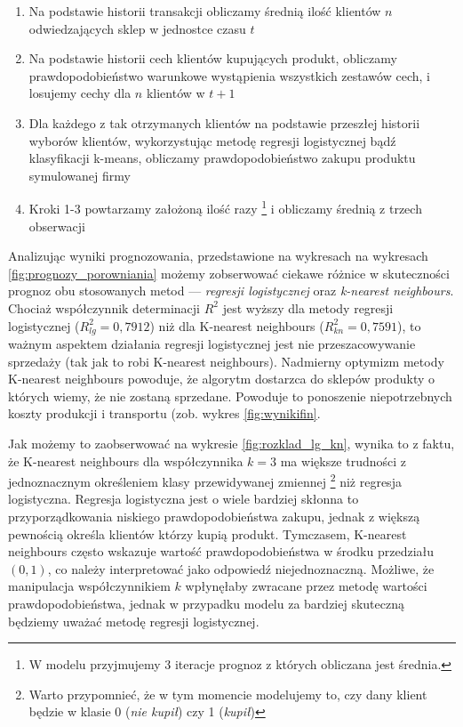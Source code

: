 \documentclass[polish, twoside, 12pt, a4paper]{article}
\theoremstyle{definition}
\theoremstyle{plain}
\theoremstyle{remark}
\begin{document}
\begin{enumerate}
	\item Na podstawie historii transakcji obliczamy średnią ilość klientów $n$ odwiedzających sklep w jednostce czasu $t$
	\item Na podstawie historii cech klientów kupujących produkt, obliczamy prawdopodobieństwo warunkowe wystąpienia wszystkich zestawów cech, i losujemy cechy dla $n$ klientów w $t+1$ 
	\item Dla każdego z tak otrzymanych klientów na podstawie przeszłej historii wyborów klientów, wykorzystując metodę regresji logistycznej bądź klasyfikacji k-means, obliczamy prawdopodobieństwo zakupu produktu symulowanej firmy
	\item Kroki 1-3 powtarzamy założoną ilość razy \footnote{W modelu przyjmujemy 3 iteracje prognoz z których obliczana jest średnia.} i obliczamy średnią z trzech obserwacji
\end{enumerate} 

Analizując wyniki prognozowania, przedstawione na wykresach na wykresach \ref{fig:prognozy_porowniania} możemy zobserwować ciekawe różnice w skuteczności prognoz obu stosowanych metod --- \textit{regresji logistycznej} oraz \textit{k-nearest neighbours}. Chociaż współczynnik determinacji $R^2$ jest wyższy dla metody regresji logistycznej ($R_{lg}^2 = 0,7912$) niż dla K-nearest neighbours ($R_{kn}^2 = 0,7591$), to ważnym aspektem działania regresji logistycznej jest nie przeszacowywanie sprzedaży (tak jak to robi K-nearest neighbours). Nadmierny optymizm metody K-nearest neighbours powoduje, że algorytm dostarzca do sklepów produkty o których wiemy, że nie zostaną sprzedane. Powoduje to ponoszenie niepotrzebnych koszty produkcji i transportu (zob. wykres \ref{fig:wynikifin}. 

Jak możemy to zaobserwować na wykresie \ref{fig:rozklad_lg_kn}, wynika to z faktu, że K-nearest neighbours dla współczynnika $k=3$ ma większe trudności z jednoznacznym określeniem klasy przewidywanej zmiennej \footnote{Warto przypomnieć, że w tym momencie modelujemy to, czy dany klient będzie w klasie 0 (\textit{nie kupił}) czy 1 (\textit{kupił})} niż regresja logistyczna. Regresja logistyczna jest o wiele bardziej skłonna to przyporządkowania niskiego prawdopodobieństwa zakupu, jednak z większą pewnością określa klientów którzy kupią produkt. Tymczasem, K-nearest neighbours często wskazuje wartość prawdopodobieństwa w środku przedziału $(0,1)$, co należy interpretować jako odpowiedź niejednoznaczną. Możliwe, że manipulacja współczynnikiem $k$ wpłynęłaby zwracane przez metodę wartości prawdopodobieństwa, jednak w przypadku modelu za bardziej skuteczną będziemy uważać metodę regresji logistycznej. 
\end{document}
